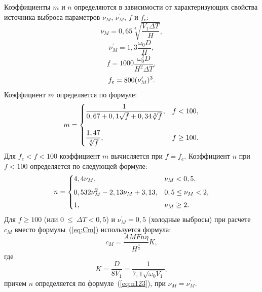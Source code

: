 \documentclass[14pt, a4paper]{extreport}
\begin{document}
	Коэффициенты $m$ и $n$ определяются в зависимости от характеризующих свойства источника выброса параметров $\nu_M$, $\nu_M^\prime$, $f$ и $f_e$:
	\begin{equation*}
		\nu_M = 0,65\sqrt[3]{\frac{V_1 \Delta T}{H}},
		\label{eq:nuM}
	\end{equation*}
	\begin{equation*}
		\nu_M^\prime = 1,3\frac{\omega_0 D}{H},
		\label{eq:nuMstrih}
	\end{equation*}
	\vspace*{-1.0cm}
	\begin{equation*}
		f = 1000\frac{\omega_0^2 D}{H^2 \Delta T},
		\label{eq:f}
	\end{equation*}
	\vspace*{-1.1cm}
	\begin{equation*}
		f_e = 800(\nu_M^\prime)^3.
		\label{eq:fe}
		\vspace*{-0.4cm}
	\end{equation*}
	Коэффициент $m$ определяется по формуле:
	\begin{equation*}
		m = 
		\begin{dcases}
			\frac{1}{0,67+0,1\sqrt{f}+0,34\sqrt[3]{f}}, & f < 100, \vspace*{0.4cm} \\ 
			\frac{1,47}{\sqrt[3]{f}}, & f \geq 100.
		\end{dcases}
		\label{eq:m1}
	\end{equation*}
	Для $f_e < f < 100$ коэффициент $m$ вычисляется при $f=f_e$. Коэффициент $n$ при $f < 100$ определяется по следующей формуле:
	\begin{equation}
		n = 
		\begin{dcases}
			4,4 \nu_M, & \nu_M < 0,5, \vspace*{0.1cm} \\ 
			0,532 \nu_M^2 - 2,13 \nu_M + 3,13, & 0,5 \leq \nu_M < 2, \vspace*{0.1cm} \\ 
			1, &  \nu_M \geq 2.
		\end{dcases}
		\label{eq:n123}
	\end{equation}
	Для $f \geq 100$ (или $0~\leq~\Delta T < 0,5$) и $\nu_M^\prime = 0,5$ (холодные выбросы) при расчете $c_M$ вместо формулы~(\ref{eq:Cm}) используется формула:
	\begin{equation*}
		c_M = \frac{AMFn\eta}{H^{\frac{4}{3}}} K,
		\label{eq:Cm2}
	\end{equation*}
	где	
	\begin{equation*}
		K = \frac{D}{8V_1} = \frac{1}{7,1\sqrt{\omega_0 V_1}},
		\label{eq:K}
	\end{equation*}
	причем $n$ определяется по формуле~(\ref{eq:n123}), при $\nu_M=\nu_M^\prime$.
	
\end{document}

